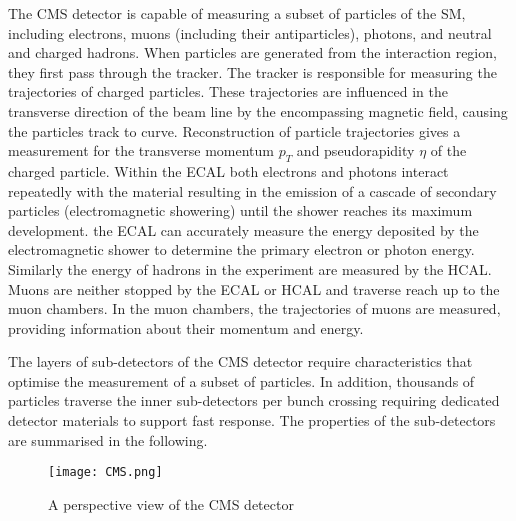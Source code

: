 The CMS detector is capable of measuring a subset of particles of the SM, including electrons, muons (including their antiparticles), photons, and neutral and charged hadrons. When particles are generated from the interaction region, they first pass through the tracker. The tracker is responsible for measuring the trajectories of charged particles. These trajectories are influenced in the transverse direction of the beam line by the encompassing magnetic field, causing the particles track to curve. Reconstruction of particle trajectories gives a measurement for the transverse momentum $p_T$ and pseudorapidity $\eta$ of the charged particle. Within the ECAL both electrons and photons interact  repeatedly with the material resulting in the emission of a cascade of secondary particles (electromagnetic showering) until the shower reaches its maximum development. the ECAL can accurately measure the energy deposited by the electromagnetic shower to determine the primary electron or photon energy. Similarly the energy of hadrons in the experiment are measured by the HCAL. Muons are neither stopped by the ECAL or HCAL and traverse reach up to the muon chambers. In the muon chambers, the trajectories of muons are measured, providing information about their momentum and energy.

The layers of sub-detectors of the CMS detector require characteristics that optimise the measurement of a subset of particles. In addition, thousands of particles traverse the inner sub-detectors per bunch crossing requiring dedicated detector materials to support fast response. The properties of the sub-detectors are summarised in the following.
\begin{figure}[t]
    \texttt{[image: CMS.png]}
    \caption{A perspective view of the CMS detector}
    \label{Fig:CMS}
\end{figure}